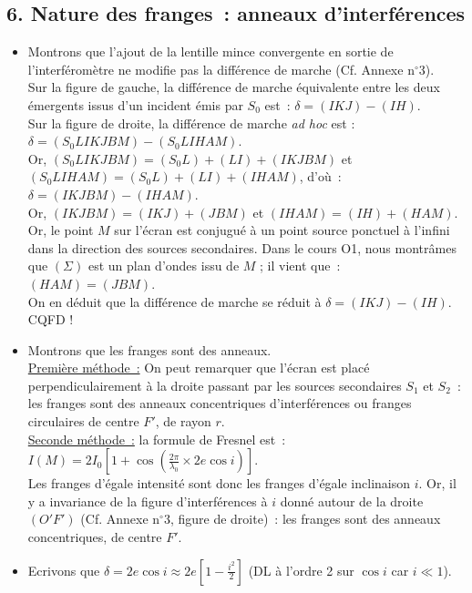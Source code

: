 \documentclass{article}
\begin{document}
\subsection*{6.  Nature des franges : anneaux d'interférences}
\begin{itemize}
\item Montrons que l'ajout de la lentille mince convergente en
sortie de l'interféromètre ne modifie pas la différence de marche
(Cf. Annexe n$^{\circ}$3). \\
Sur la figure de gauche, la différence de marche équivalente entre
les deux émergents issus d'un incident émis par $S_{0}$ est :
$\delta = (IKJ) - (IH)$.\\
Sur la figure de droite, la différence de marche \textit{ad hoc} est
: $\delta = \left(S_{0}LIKJBM\right)-\left(S_{0}LIHAM\right)$. \\
Or, $\left(S_{0}LIKJBM\right) = \left(S_{0}L\right)+(LI)+\left(IKJBM\right)$ et $\left(S_{0}LIHAM\right) =
\left(S_{0}L\right)+(LI)+(IHAM)$, d'où : $\delta = \left(IKJBM\right) - (IHAM)$.
\\
Or, $\left(IKJBM\right) = (IKJ)+(JBM)$ et $(IHAM) = (IH)+(HAM)$. Or, le point
$M$ sur l'écran est conjugué à un point source ponctuel à l'infini
dans la direction des sources secondaires. Dans le cours O1, nous
montrâmes que $\left(\Sigma\right)$ est un plan d'ondes issu de $M$ ; il vient
que : $(HAM) = (JBM)$. \\
On en déduit que la différence de marche se réduit à $\delta = (IKJ)
- (IH)$. CQFD !
\item Montrons que les franges sont des anneaux. \\
\underline{Première méthode :} On peut remarquer que l'écran est
placé perpendiculairement à la droite passant par les sources
secondaires $S_{1}$ et $S_{2}$ : les franges sont des anneaux
concentriques d'interférences ou franges
circulaires de centre $F'$, de rayon $r$. \\
\underline{Seconde méthode :} la formule de Fresnel est : $I(M) =
2I_{0}\left[1+\cos\left(\frac{2\pi}{\lambda_{0}}\times 2e\cos i\right)\right]$. \\
Les franges d'égale intensité sont donc les franges d'égale
inclinaison $i$. Or, il y a invariance de la figure d'interférences
à $i$ donné autour de la droite $(O'F')$ (Cf. Annexe n$^{\circ}$3,
figure de droite) : les franges sont des anneaux concentriques, de
centre $F'$.
\item Ecrivons que $\delta = 2e\cos i \approx 2e\left[1 -
\frac{i^{2}}{2}\right]$ (DL à l'ordre 2 sur $\cos i$ car $i \ll 1$). \\

\end{itemize}
\end{document}
